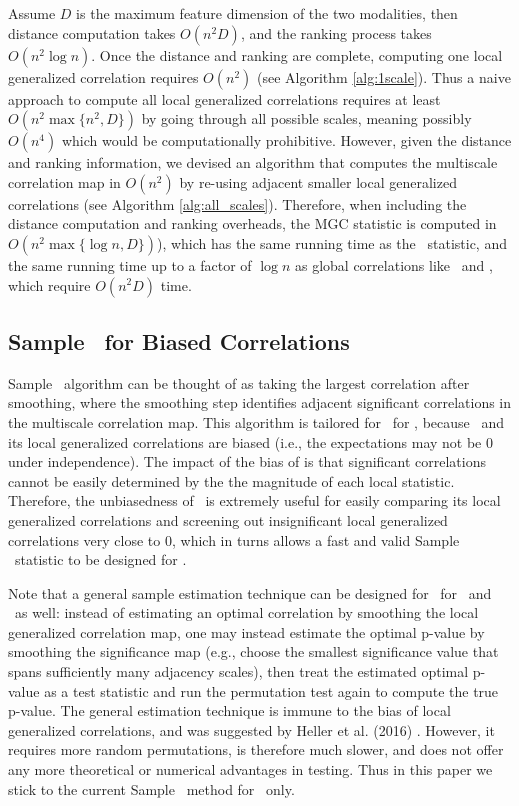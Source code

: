 \documentclass[11pt]{article}
\begin{document}
Assume $D$ is the maximum feature dimension of the two modalities, then distance computation takes $O(n^2 D)$, and the ranking process takes $O(n^2 \log n)$. Once the distance and ranking are complete, computing one local generalized correlation requires $O(n^2)$ (see Algorithm \ref{alg:1scale}). Thus a naive approach to compute all local generalized correlations requires at least $O(n^2 \max\{n^2, D\})$ by going through all possible scales, meaning possibly $O(n^4)$ which would be computationally prohibitive. However, given the distance and ranking information, we devised an algorithm that computes the multiscale correlation map in $O(n^2)$ by re-using adjacent smaller local generalized correlations (see Algorithm \ref{alg:all_scales}). 
Therefore, when including the distance computation and ranking overheads, the MGC statistic is computed in $O(n^2 \max\{\log n,D\})$), which has the same running time as the \Hhg~statistic, and the same running time up to a factor of $\log n$ as  global correlations like \Dcorr~and \Mcorr, which require  $O(n^2D)$ time.


\subsection{Sample \Mgc~for Biased Correlations}

Sample \Mgc~algorithm can be thought of as taking the largest correlation after smoothing, where the smoothing step identifies adjacent significant correlations in the multiscale correlation map. This algorithm is tailored for \Mgc~for \Mcorr, because \Dcorr~and its local generalized correlations are biased (i.e., the expectations may not be $0$ under independence). The impact of the bias of \Dcorr is that significant correlations cannot be easily determined by the the magnitude of each local statistic. Therefore, the unbiasedness of \Mcorr~is extremely useful for easily comparing its local generalized correlations and screening out insignificant local generalized correlations very close to $0$, which in turns allows a fast and valid Sample \Mgc~statistic to be designed for \Mcorr. 



Note that a general sample estimation technique can be designed for \Mgc~for \Dcorr~and \Mantel~as well: instead of estimating an optimal correlation by smoothing the local generalized correlation map, one may instead estimate the optimal p-value by smoothing the significance map (e.g., choose the smallest significance value that spans sufficiently many adjacency scales), then treat the estimated optimal p-value as a test statistic and run the permutation test again to compute the true p-value. The general estimation technique is immune to the bias of local generalized correlations, and was suggested by Heller et al. (2016) \cite{heller2016consistent}. However, it requires more random permutations, is therefore much slower, and does not offer any more theoretical or numerical advantages in testing. Thus in this paper we stick to the current Sample \Mgc~method for \Mcorr~only.
\end{document}
